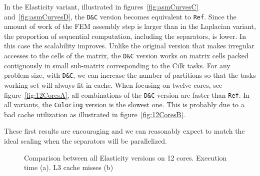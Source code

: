 \documentclass[10pt]{IOS-Book-Article}
\begin{document}
In the Elasticity variant, illustrated in figures~\ref{fig:asmCurvesC} and~\ref{fig:asmCurvesD}, the {\tt D\&C} version becomes equivalent to {\tt Ref}.
Since the amount of work of the FEM assembly step is larger than in the Laplacian variant, the proportion of sequential computation, including the separators, is lower. In this case the scalability improves.
Unlike the original version that makes irregular accesses to the cells of the matrix, the {\tt D\&C} version works on matrix cells packed contiguously in small sub-matrix corresponding to the Cilk tasks.
For any problem size, with {\tt D\&C}, we can increase the number of partitions so that the tasks working-set will always fit in cache.
When focusing on twelve cores, see figure~\ref{fig:12CoresA}, all combinations of the {\tt D\&C} version are faster than {\tt Ref}.
In all variants, the {\tt Coloring} version is the slowest one. This is probably due to a bad cache utilization as illustrated in figure~\ref{fig:12CoresB}.

These first results are encouraging and we can reasonably expect to match the ideal scaling when the separators will be parallelized.

\begin{figure}[htp]
 \caption{Comparison between all Elasticity versions on 12 cores. Execution time (a). L3 cache misses (b)}
 \label{fig:12Cores}
\end{figure}
\end{document}
